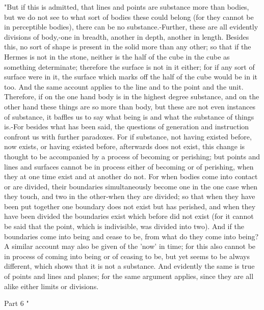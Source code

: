 "But if this is admitted, that lines and points are substance more
than bodies, but we do not see to what sort of bodies these could
belong (for they cannot be in perceptible bodies), there can be no
substance.-Further, these are all evidently divisions of body,-one
in breadth, another in depth, another in length. Besides this, no
sort of shape is present in the solid more than any other; so that
if the Hermes is not in the stone, neither is the half of the cube
in the cube as something determinate; therefore the surface is not
in it either; for if any sort of surface were in it, the surface which
marks off the half of the cube would be in it too. And the same account
applies to the line and to the point and the unit. Therefore, if on
the one hand body is in the highest degree substance, and on the other
hand these things are so more than body, but these are not even instances
of substance, it baffles us to say what being is and what the substance
of things is.-For besides what has been said, the questions of generation
and instruction confront us with further paradoxes. For if substance,
not having existed before, now exists, or having existed before, afterwards
does not exist, this change is thought to be accompanied by a process
of becoming or perishing; but points and lines and surfaces cannot
be in process either of becoming or of perishing, when they at one
time exist and at another do not. For when bodies come into contact
or are divided, their boundaries simultaneously become one in the
one case when they touch, and two in the other-when they are divided;
so that when they have been put together one boundary does not exist
but has perished, and when they have been divided the boundaries exist
which before did not exist (for it cannot be said that the point,
which is indivisible, was divided into two). And if the boundaries
come into being and cease to be, from what do they come into being?
A similar account may also be given of the 'now' in time; for this
also cannot be in process of coming into being or of ceasing to be,
but yet seems to be always different, which shows that it is not a
substance. And evidently the same is true of points and lines and
planes; for the same argument applies, since they are all alike either
limits or divisions. 

Part 6 "

